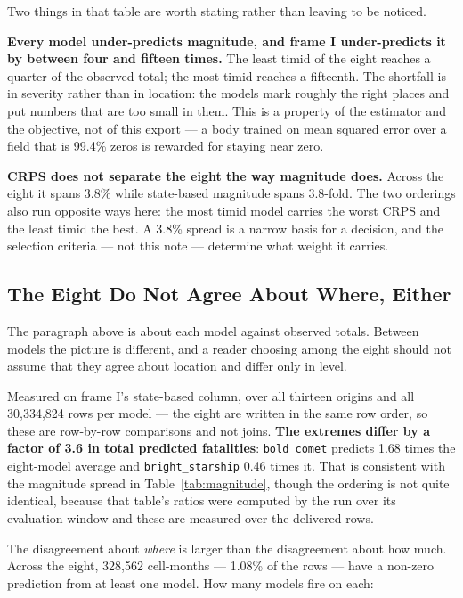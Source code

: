 \noindent Two things in that table are worth stating rather than leaving to be noticed.

\textbf{Every model under-predicts magnitude, and frame I under-predicts it by between four and
fifteen times.} The least timid of the eight reaches a quarter of the observed total; the most
timid reaches a fifteenth. The shortfall is in severity rather than in location: the models mark
roughly the right places and put numbers that are too small in them. This is a property of the
estimator and the objective, not of this export --- a body trained on mean squared error over a
field that is 99.4\% zeros is rewarded for staying near zero.

\textbf{CRPS does not separate the eight the way magnitude does.} Across the eight it spans 3.8\%
while state-based magnitude spans 3.8-fold. The two orderings also run opposite ways here: the most
timid model carries the worst CRPS and the least timid the best. A 3.8\% spread is a narrow basis
for a decision, and the selection criteria --- not this note --- determine what weight it carries.

\subsection*{The Eight Do Not Agree About Where, Either}

The paragraph above is about each model against observed totals. Between models the picture is
different, and a reader choosing among the eight should not assume that they agree about location
and differ only in level.

Measured on frame I's state-based column, over all thirteen origins and all 30,334,824 rows per
model --- the eight are written in the same row order, so these are row-by-row comparisons and not
joins. \textbf{The extremes differ by a factor of 3.6 in total predicted fatalities}:
\texttt{bold\_comet} predicts 1.68 times the eight-model average and \texttt{bright\_starship}
0.46 times it. That is consistent with the magnitude spread in Table~\ref{tab:magnitude}, though
the ordering is not quite identical, because that table's ratios were computed by the run over its
evaluation window and these are measured over the delivered rows.

The disagreement about \emph{where} is larger than the disagreement about how much. Across the
eight, 328,562 cell-months --- 1.08\% of the rows --- have a non-zero prediction from at least one
model. How many models fire on each:

